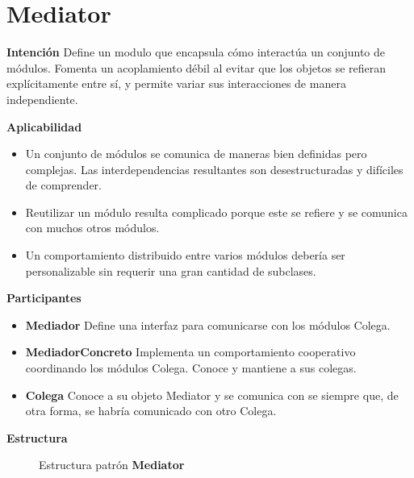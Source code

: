 \section{Mediator}

\textbf{Intención}
Define un modulo que encapsula cómo interactúa un conjunto de módulos. Fomenta un acoplamiento débil al evitar que los objetos se refieran explícitamente entre sí, y permite variar sus interacciones de manera independiente.

\textbf{Aplicabilidad}
\begin{itemize}
\item Un conjunto de módulos se comunica de maneras bien definidas pero complejas. Las interdependencias resultantes son desestructuradas y difíciles de comprender.

\item Reutilizar un módulo resulta complicado porque este se refiere y se comunica con muchos otros módulos.

\item Un comportamiento distribuido entre varios módulos debería ser personalizable sin requerir una gran cantidad de subclases.
\end{itemize}

\textbf{Participantes}

\begin{itemize}
\item \textbf{Mediador} Define una interfaz para comunicarse con los módulos Colega.
\item \textbf{MediadorConcreto} Implementa un comportamiento cooperativo coordinando los módulos Colega. Conoce y mantiene a sus colegas.
\item \textbf{Colega} Conoce a su objeto Mediator y se comunica con se siempre que, de otra forma, se habría comunicado con otro Colega.
\end{itemize}

\textbf{Estructura}

\begin{figure}[h]
\caption{Estructura patrón \textbf{Mediator}}
\begin{center}
\end{center}
\end{figure}

